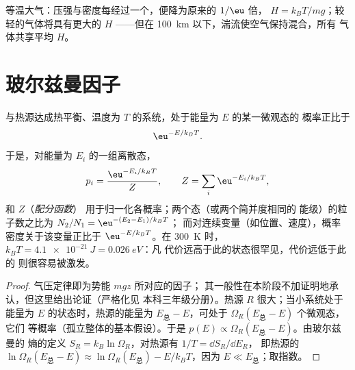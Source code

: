 \begin{omfigure}

{\small 等温大气：压强与密度每经过一个，便降为原来的 $1/\eu$
倍， $H = k_BT/mg$；较轻的气体将具有更大的 $H$
——但在 \qty{100}{km} 以下，湍流使空气保持混合，所有
气体共享平均 $H$。}
\end{omfigure}

\section{玻尔兹曼因子}

\begin{theorem}[玻尔兹曼因子]\label{thm:b2:boltzmann-factor:factor}
与热源达成热平衡、温度为
$T$ 的系统，处于能量为 $E$ 的某一微观态的
概率正比于
\[
\eu^{-E/k_BT} .
\]
于是，对能量为 $E_i$ 的一组离散态，
\[
p_i = \frac{\eu^{-E_i/k_BT}}{Z}, \qquad Z = \sum_i\eu^{-E_i/k_BT} ,
\]
和 $Z$（\emph{配分函数}）
用于归一化各概率；两个态（或两个简并度相同的
能级）的粒子数之比为 $N_2/N_1 = \eu^{-(E_2 - E_1)/k_BT}$；
而对连续变量（如位置、速度），概率
密度关于该变量正比于 $\eu^{-E/k_BT}$。在
\qty{300}{K} 时，$k_BT = \qty{4.1e-21}{J} = \qty{0.026}{eV}$：凡
代价远高于此的状态很罕见，代价远低于此的
则很容易被激发。
\end{theorem}

\begin{proof}
气压定律即为势能 $mgz$ 所对应的因子；
其一般性在本阶段不加证明地承认，但这里给出论证（严格化见
本科三年级分册）。热源 $R$ 很大；当小系统处于
能量为 $E$ 的状态时，热源的能量为 $E_{\text{总}} -
E$，可处于 $\Omega_R(E_{\text{总}} - E)$ 个微观态，它们
等概率（孤立整体的基本假设）。于是
$p(E) \propto \Omega_R(E_{\text{总}} - E)$。由玻尔兹曼的
熵的定义 $S_R = k_B\ln\Omega_R$，对热源有 $1/T = \dd S_R/\dd E_R$，
即热源的 $\ln\Omega_R(E_{\text{总}} - E) \approx \ln\Omega_R(E_{\text{总}})
- E/k_BT$，因为 $E \ll E_{\text{总}}$；取指数。
\end{proof}

